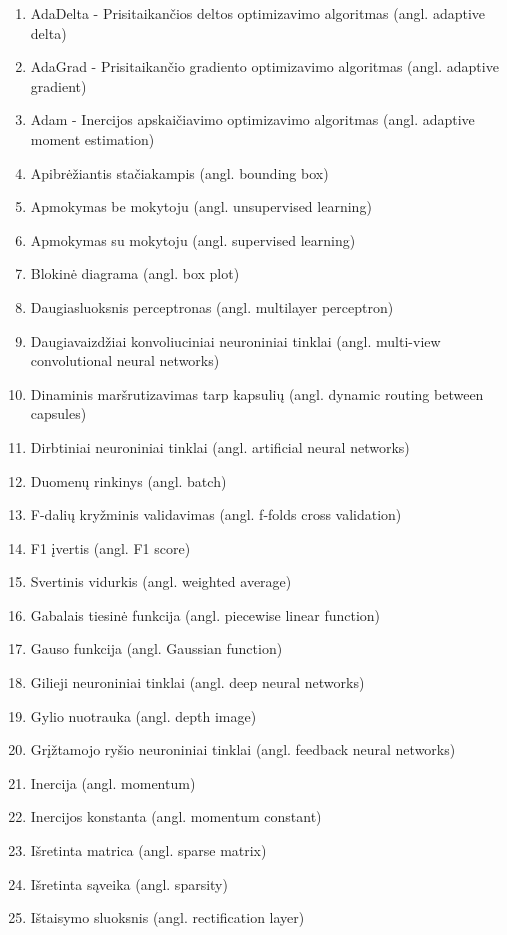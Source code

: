 
\begin{enumerate}
	\item AdaDelta - Prisitaikančios deltos optimizavimo algoritmas (angl. adaptive delta)
	\item AdaGrad - Prisitaikančio gradiento optimizavimo algoritmas (angl. adaptive gradient)
	\item Adam - Inercijos apskaičiavimo optimizavimo algoritmas (angl. adaptive moment estimation)
	\item Apibrėžiantis stačiakampis (angl. bounding box)
	\item Apmokymas be mokytoju (angl. unsupervised learning)
	\item Apmokymas su mokytoju (angl. supervised learning)
	\item Blokinė diagrama (angl. box plot)
	\item Daugiasluoksnis perceptronas (angl. multilayer perceptron)
	\item Daugiavaizdžiai konvoliuciniai neuroniniai tinklai (angl. multi-view convolutional neural networks)
	\item Dinaminis maršrutizavimas tarp kapsulių (angl. dynamic routing between capsules)
	\item Dirbtiniai neuroniniai tinklai (angl. artificial neural networks)
	\item Duomenų rinkinys (angl. batch)
	\item F-dalių kryžminis validavimas (angl. f-folds cross validation)
	\item F1 įvertis (angl. F1 score)
	\item Svertinis vidurkis (angl. weighted average)
	\item Gabalais tiesinė funkcija (angl. piecewise linear function)
	\item Gauso funkcija (angl. Gaussian function)
	\item Gilieji neuroniniai tinklai (angl. deep neural networks)
	\item Gylio nuotrauka (angl. depth image)
	\item Grįžtamojo ryšio neuroniniai tinklai (angl. feedback neural networks)
	\item Inercija (angl. momentum)
	\item Inercijos konstanta (angl. momentum constant)
	\item Išretinta matrica (angl. sparse matrix)
	\item Išretinta sąveika (angl. sparsity)
	\item Ištaisymo sluoksnis (angl. rectification layer)

\end{enumerate}
